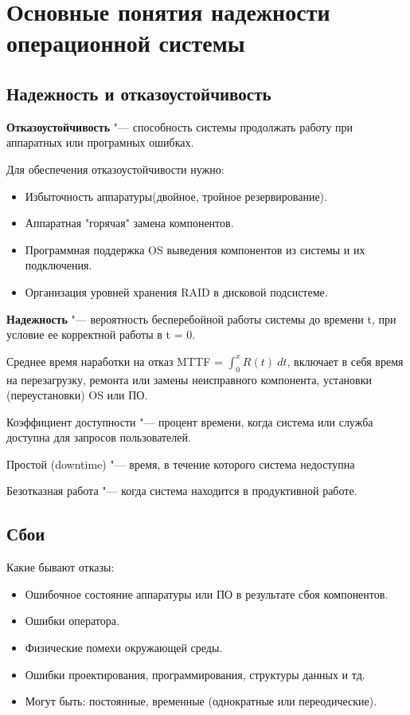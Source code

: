 \documentclass[bachelor, och, book]{SCWorks}
\theoremstyle{remark}
\begin{document}
    \section{Основные понятия надежности операционной системы}

    \subsection{Надежность и отказоустойчивость}

    \textbf{Отказоустойчивость} "--- способность системы продолжать работу при аппаратных или програмных ошибках.

    Для обеспечения отказоустойчивости нужно:

    \begin{itemize}[label=$\bullet$]
        \item Избыточность аппаратуры(двойное, тройное резервирование).
        \item Аппаратная "горячая" замена компонентов.
        \item Программная поддержка OS выведения компонентов из системы и их подключения.
        \item Организация уровней хранения RAID в дисковой подсистеме.
    \end{itemize}

    \textbf{Надежность} "--- вероятность бесперебойной работы системы до времени t, при условие ее корректной работы в t = 0.

    Среднее время наработки на отказ MTTF = $\int_{0}^{x} R(t) \ d t$, включает в себя время на перезагрузку, ремонта или замены неисправного компонента, установки (переустановки) OS или ПО.

    Коэффициент доступности "--- процент времени, когда система или служба доступна для запросов пользователей.

    Простой (downtime) "--- время, в течение которого система недоступна

    Безотказная работа "--- когда система находится в продуктивной работе.

    \subsection{Сбои}

    \hfill \break
    Какие бывают отказы:
    \begin{itemize}[label=$\bullet$]
        \item Ошибочное состояние аппаратуры или ПО в результате сбоя компонентов.
        \item Ошибки оператора.
        \item Физические помехи окружающей среды.
        \item Ошибки проектирования, программирования, структуры данных и тд.
        \item Могут быть: постоянные, временные (однократные или переодические).
    \end{itemize}
\end{document}
